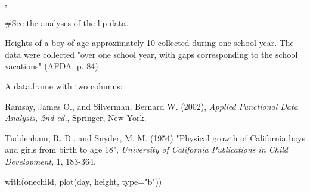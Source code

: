 \documentclass{article}
\begin{document}
\begin{SeeAlso}\relax
{},
\end{SeeAlso}
\begin{Examples}
\begin{ExampleCode}
#See the analyses of the lip data.
\end{ExampleCode}
\end{Examples}

\begin{Description}\relax
Heights of a boy of age approximately 10 collected during one school
year.  The data were collected "over one school year, with gaps
corresponding to the school vacations" (AFDA, p. 84)
\end{Description}
\begin{Format}\relax
A data.frame with two columns:  
\end{Format}
\begin{Source}\relax
Ramsay, James O., and Silverman, Bernard W. (2002), \emph{Applied
Functional Data Analysis, 2nd ed.}, Springer, New York. 

Tuddenham, R. D., and Snyder, M. M. (1954) "Physical growth of
California boys and girls from birth to age 18", \emph{University of
California Publications in Child Development}, 1, 183-364.
\end{Source}
\begin{Examples}
\begin{ExampleCode}
with(onechild, plot(day, height, type="b"))

\end{ExampleCode}
\end{Examples}
\end{document}
